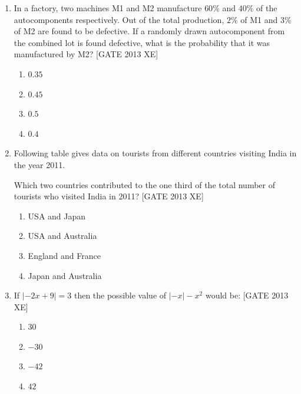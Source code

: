 \documentclass[journal,12pt,onecolumn]{IEEEtran}
\theoremstyle{remark}
\begin{document}
\begin{enumerate}
    \item In a factory, two machines M1 and M2 manufacture $60\%$ and $40\%$ of the autocomponents respectively. Out of the total production, $2\%$ of M1 and $3\%$ of M2 are found to be defective. If a randomly drawn autocomponent from the combined lot is found defective, what is the probability that it was manufactured by M2? \hfill[GATE 2013 XE]
    \begin{multicols}{2}
    \begin{enumerate}
        \item $0.35$
        \item $0.45$
        \item $0.5$
        \item $0.4$
    \end{enumerate}
    \end{multicols}

    \item Following table gives data on tourists from different countries visiting India in the year 2011.



    Which two countries contributed to the one third of the total number of tourists who visited India in 2011? \hfill[GATE 2013 XE]
    \begin{multicols}{2}
    \begin{enumerate}
        \item USA and Japan
        \item USA and Australia
        \item England and France
        \item Japan and Australia
    \end{enumerate}
    \end{multicols}

    \item If $|{-2x}+ 9| = 3$ then the possible value of $|{-x}| - x^{2}$ would be: \hfill[GATE 2013 XE]
    \begin{multicols}{2}
    \begin{enumerate}
        \item $30$
        \item $-30$
        \item $-42$
        \item $42$
    \end{enumerate}
    \end{multicols}


\end{enumerate}
\end{document}
